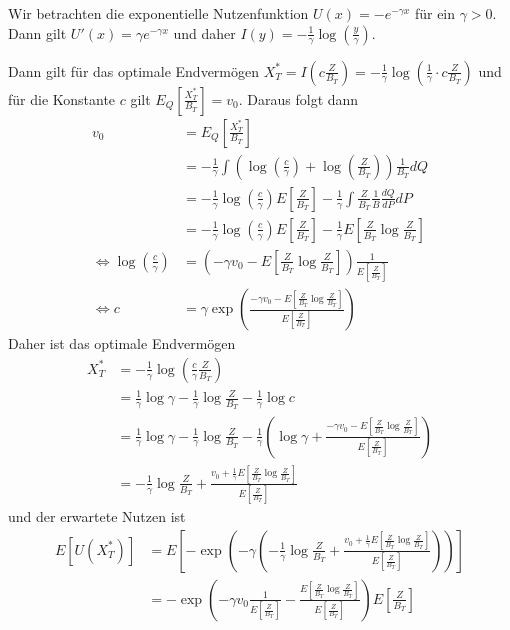 \documentclass[a4paper,twoside,DIV15,BCOR12mm]{scrbook}
\begin{document}
\begin{beispiel}
\label{bsp:3.3.2}
Wir betrachten die exponentielle Nutzenfunktion $U(x) = -e^{-\gamma x}$ für ein $\gamma >0$. Dann gilt $U'(x) = \gamma e^{-\gamma x}$ und daher $I(y) = -\frac1\gamma \log(\frac y \gamma)$.

Dann gilt für das optimale Endvermögen $X_T^* = I(c \frac{Z}{B_T}) = -\frac{1}{\gamma}\log(\frac1\gamma \cdot c \frac{Z}{B_T})$ und für die Konstante $c$ gilt $E_Q[\frac{X_T^*}{B_T}] = v_0$.
Daraus folgt dann
\begin{align*}
v_0 &= E_Q[\frac{X_T^*}{B_T}]  \\
&= - \frac1\gamma \int (\log(\frac c \gamma) + \log (\frac{Z}{B_T})) \frac1{B_T} dQ \\
&= - \frac1\gamma \log(\frac c \gamma)E[\frac{Z}{B_T}] - \frac1\gamma \int \frac{Z}{B_T} \frac1{B} \frac{dQ}{dP} dP \\
&= - \frac1\gamma \log(\frac c \gamma)E[\frac{Z}{B_T}] - \frac1\gamma E[\frac{Z}{B_T} \log \frac{Z}{B_T}] \\
\iff \log(\frac c\gamma) &= (-\gamma v_0 - E[\frac{Z}{B_T} \log \frac{Z}{B_T}]) \frac{1}{E[\frac{Z}{B_T}]} \\
\iff c &= \gamma \exp\left( \frac{-\gamma v_0 - E[\frac{Z}{B_T} \log \frac{Z}{B_T}]}{E[\frac{Z}{B_T}]} \right)
\end{align*}
Daher ist das optimale Endvermögen
\begin{align*}
X_T^*& = -\frac{1}\gamma \log (\frac c\gamma \frac{Z}{B_T}) \\
&= \frac{1}\gamma \log \gamma - \frac1\gamma \log  \frac{Z}{B_T} - \frac1\gamma \log c \\
&= \frac{1}\gamma \log \gamma - \frac1\gamma \log  \frac{Z}{B_T} - \frac1\gamma \left (\log \gamma + \frac{-\gamma v_0 - E[\frac{Z}{B_T} \log \frac{Z}{B_T}]}{E[\frac{Z}{B_T}]}\right) \\
&= - \frac1\gamma \log  \frac{Z}{B_T} +  \frac{v_0 + \frac1\gamma E[\frac{Z}{B_T} \log \frac{Z}{B_T}]}{E[\frac{Z}{B_T}]}
\end{align*}
und der erwartete Nutzen ist
\begin{align*}
E[U(X_T^*)] &= E[-\exp(-\gamma (- \frac1\gamma \log  \frac{Z}{B_T} +  \frac{v_0 + \frac1\gamma E[\frac{Z}{B_T} \log \frac{Z}{B_T}]}{E[\frac{Z}{B_T}]}))] \\
&= -\exp\left( -\gamma v_0 \frac1{E[\frac{Z}{B_T}]} - \frac{E[\frac{Z}{B_T} \log \frac{Z}{B_T}]}{E[\frac{Z}{B_T}]} \right) E[\frac{Z}{B_T}]
\end{align*}
\end{beispiel}
\end{document}
